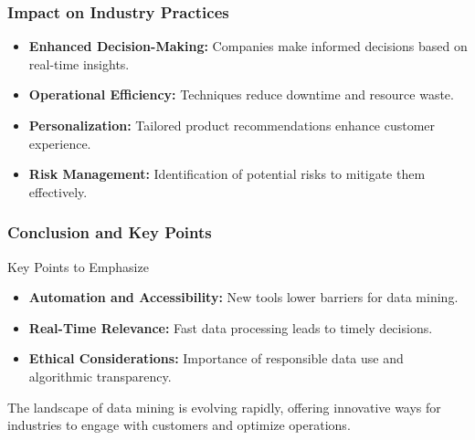 \documentclass{beamer}
\begin{document}
\begin{frame}[fragile]
    \frametitle{Impact on Industry Practices}
    
    \begin{itemize}
        \item \textbf{Enhanced Decision-Making:} Companies make informed decisions based on real-time insights.
        \item \textbf{Operational Efficiency:} Techniques reduce downtime and resource waste.
        \item \textbf{Personalization:} Tailored product recommendations enhance customer experience.
        \item \textbf{Risk Management:} Identification of potential risks to mitigate them effectively.
    \end{itemize}
\end{frame}

\begin{frame}[fragile]
    \frametitle{Conclusion and Key Points}
    
    \begin{block}{Key Points to Emphasize}
        \begin{itemize}
            \item \textbf{Automation and Accessibility:} New tools lower barriers for data mining.
            \item \textbf{Real-Time Relevance:} Fast data processing leads to timely decisions.
            \item \textbf{Ethical Considerations:} Importance of responsible data use and algorithmic transparency.
        \end{itemize}
    \end{block}
    
    The landscape of data mining is evolving rapidly, offering innovative ways for industries to engage with customers and optimize operations.
\end{frame}
\end{document}
